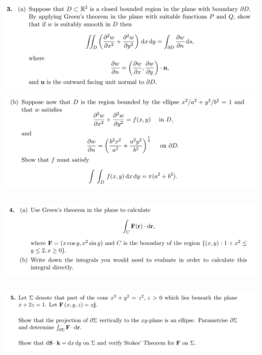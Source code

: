\documentclass[12pt]{article}
\begin{document}
\subsection{}
\begin{mdframed}
\includegraphics[width=400pt]{img/oxford-prelims-M5-multivariable-calc-7-3-a.png}
\end{mdframed}

\begin{mdframed}
\includegraphics[width=400pt]{img/oxford-prelims-M5-multivariable-calc-7-3-b.png}
\end{mdframed}

\subsection{}
\begin{mdframed}
\includegraphics[width=400pt]{img/oxford-prelims-M5-multivariable-calc-7-4.png}
\end{mdframed}

\subsection{}
\begin{mdframed}
\includegraphics[width=400pt]{img/oxford-prelims-M5-multivariable-calc-7-5.png}
\end{mdframed}
\end{document}
